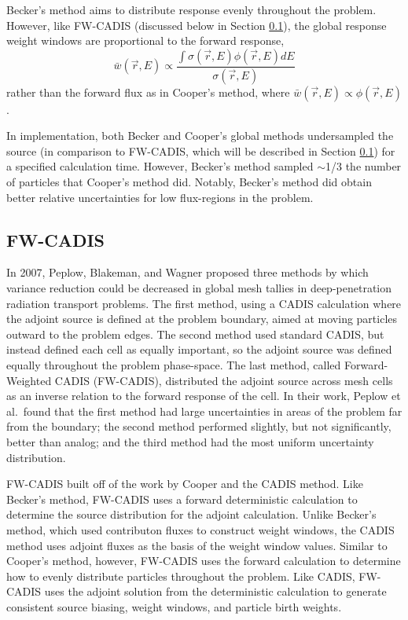 Becker's method aims to distribute response evenly throughout the problem.
However, like FW-CADIS
(discussed below in Section \ref{subsec:FWCADIS}),
the global response weight windows are proportional to the forward response,
\begin{equation}
  \bar{w}(\vec{r},E) \propto \frac{\int \sigma(\vec{r},E) \phi (\vec{r},E) dE}
                                  {\sigma (\vec{r},E)}
\end{equation}
rather than the forward flux as in Cooper's method, where
$\bar{w}(\vec{r},E) \propto \phi(\vec{r},E)$ .

In implementation, both Becker and Cooper's global methods
undersampled the source (in comparison to FW-CADIS, which will be described in
Section \ref{subsec:FWCADIS}) for a specified calculation
time. However, Becker's method sampled $\sim$1/3 the number of particles that
Cooper's method did. Notably, Becker's method did obtain better relative
uncertainties for low flux-regions in the problem.

\subsection{FW-CADIS}
\label{subsec:FWCADIS}

In 2007, Peplow, Blakeman, and Wagner \cite{peplow_advanced_2007} proposed three
methods by which variance reduction could be decreased in global mesh tallies in
deep-penetration radiation transport problems. The first method, using a CADIS
calculation where the adjoint source is defined at the problem boundary, aimed
at moving particles outward to the problem edges.
The second method used standard CADIS, but instead
defined each cell as equally important, so the adjoint source was defined
equally throughout the problem phase-space. The last method, called Forward-Weighted
CADIS (FW-CADIS), distributed the adjoint source across mesh cells as an inverse
relation to the forward response of the cell. In their work, Peplow et al.\ found
that the first method had large uncertainties in areas of the problem far
from the boundary; the second method performed slightly, but not significantly,
better than analog; and the third method had the most uniform uncertainty
distribution.

FW-CADIS
\cite{wagner_forward-weighted_2007,wagner_forward-weighted_2009,wagner_forward-weighted_2010}
built off of the work by Cooper and the CADIS method.
Like Becker's method, FW-CADIS uses a forward deterministic calculation to
determine the source distribution for the adjoint calculation. Unlike Becker's
method, which used contributon fluxes to construct weight windows,
the CADIS method uses adjoint fluxes as the basis of the weight window values.
Similar to
Cooper's method, however, FW-CADIS uses the forward calculation to determine how to
evenly distribute particles throughout the problem. Like CADIS, FW-CADIS uses
the adjoint solution from the deterministic calculation to generate consistent
source biasing, weight windows, and particle birth weights.

